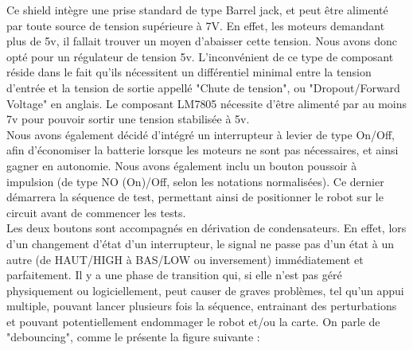 			Ce shield intègre une prise standard de type Barrel jack, et peut être alimenté par toute source de tension supérieure à 7V. 
			En effet, les moteurs demandant plus de 5v, il fallait trouver un moyen d'abaisser cette tension. Nous avons donc opté pour un régulateur de tension 5v. L'inconvénient de ce type de composant réside dans le fait qu'ils nécessitent un différentiel minimal entre la tension d'entrée et la tension de sortie appellé "Chute de tension", ou "Dropout/Forward Voltage" en anglais. Le composant LM7805 nécessite d'être alimenté par au moins 7v \cite{bib21} pour pouvoir sortir une tension stabilisée à 5v.\\

			Nous avons également décidé d'intégré un interrupteur à levier de type On/Off, afin d'économiser la batterie lorsque les moteurs ne sont pas nécessaires, et ainsi gagner en autonomie. Nous avons également inclu un bouton poussoir à impulsion (de type NO (On)/Off, selon les notations normalisées). Ce dernier démarrera la séquence de test, permettant ainsi de positionner le robot sur le circuit avant de commencer les tests.\\
			Les deux boutons sont accompagnés en dérivation de condensateurs. En effet, lors d'un changement d'état d'un interrupteur, le signal ne passe pas d'un état à un autre (de HAUT/HIGH à BAS/LOW ou inversement) immédiatement et parfaitement. Il y a une phase de transition qui, si elle n'est pas géré physiquement ou logiciellement, peut causer de graves problèmes, tel qu'un appui multiple, pouvant lancer plusieurs fois la séquence, entrainant des perturbations et pouvant potentiellement endommager le robot et/ou la carte. On parle de "debouncing", comme le présente la figure suivante :
